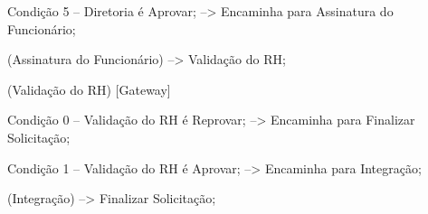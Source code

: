                            Condição 5
                              -- Diretoria é Aprovar;
                                 --> Encaminha para Assinatura do Funcionário;

                           (Assinatura do Funcionário)
                              --> Validação do RH;

                              (Validação do RH)
                                 [Gateway]

                                    Condição 0
                                       -- Validação do RH é Reprovar;
                                          --> Encaminha para Finalizar Solicitação;

                                    Condição 1
                                       -- Validação do RH é Aprovar;
                                          --> Encaminha para Integração;

                                    (Integração)
                                       --> Finalizar Solicitação;
